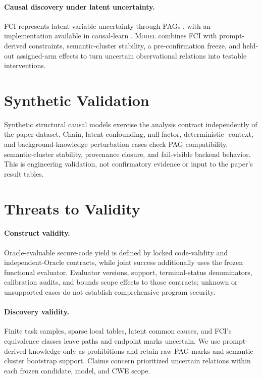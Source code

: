 \documentclass[acmsmall,screen,review,anonymous]{acmart}
\newcommand{\model}{\textsc{Model}\xspace}
\begin{document}
\paragraph{Causal discovery under latent uncertainty.}
FCI represents latent-variable uncertainty through PAGs
\cite{spirtes1995fci,zhang2008ancestral}, with an implementation available in
causal-learn \cite{zheng2024causallearn}. \model combines FCI with
prompt-derived constraints, semantic-cluster stability, a pre-confirmation
freeze, and held-out assigned-arm effects to turn uncertain observational
relations into testable interventions.

\section{Synthetic Validation}

Synthetic structural causal models exercise the analysis contract independently
of the paper dataset. Chain, latent-confounding, null-factor, deterministic-
context, and background-knowledge perturbation cases check PAG compatibility,
semantic-cluster stability, provenance closure, and fail-visible backend
behavior. This is engineering validation, not confirmatory evidence or input
to the paper's result tables.

\section{Threats to Validity}

\paragraph{Construct validity.}
Oracle-evaluable secure-code yield is defined by locked code-validity and
independent-Oracle contracts, while joint success additionally uses the frozen
functional evaluator. Evaluator versions, support, terminal-status
denominators, calibration audits, and bounds scope effects to those contracts;
unknown or unsupported cases do not establish comprehensive program security.

\paragraph{Discovery validity.}
Finite task samples, sparse local tables, latent common causes, and FCI's
equivalence classes leave paths and endpoint marks uncertain. We use
prompt-derived knowledge only as prohibitions and retain raw PAG marks and
semantic-cluster bootstrap support. Claims concern prioritized uncertain
relations within each frozen candidate, model, and CWE scope.
\end{document}
